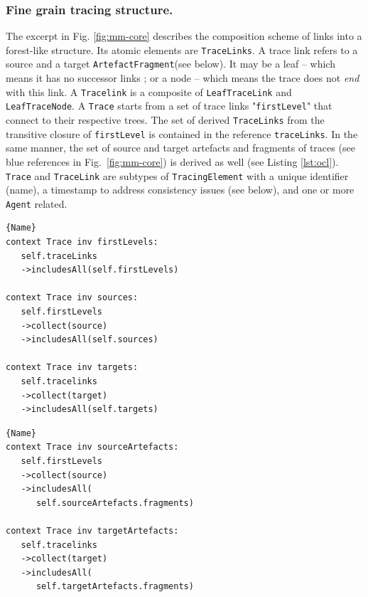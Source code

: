 \subsubsection{Fine grain tracing structure.} The excerpt in Fig. \ref{fig:mm-core} describes the composition scheme of links into a forest-like structure. Its atomic elements are \texttt{TraceLinks}. A trace link refers to a source and a target \texttt{ArtefactFragment}(see below). It may be a leaf -- which means it has no successor links ; or a node -- which means the trace does not \textit{end} with this link. A \texttt{Tracelink} is a composite of \texttt{LeafTraceLink} and \texttt{LeafTraceNode}. A \texttt{Trace} starts from a set of trace links "\texttt{firstLevel}" that connect to their respective trees. The set of derived \texttt{TraceLinks} from the transitive closure of \texttt{firstLevel} is contained in the reference \texttt{traceLinks}. In the same manner, the set of source and target artefacts and fragments of traces (see blue references in Fig.~\ref{fig:mm-core}) is derived as well (see Listing \ref{lst:ocl}).  \texttt{Trace} and \texttt{TraceLink} are subtypes of \texttt{TracingElement} with a unique identifier (name), a timestamp to address consistency issues (see below), and one or more \texttt{Agent} related. 


\lstset{style=mystyleocl}
\noindent\begin{minipage}[t]{.45\textwidth}
\begin{lstlisting}[frame=tlrb]{Name}
context Trace inv firstLevels:
   self.traceLinks
   ->includesAll(self.firstLevels)
   
context Trace inv sources:
   self.firstLevels
   ->collect(source)
   ->includesAll(self.sources)
   
context Trace inv targets:
   self.tracelinks
   ->collect(target)
   ->includesAll(self.targets)
\end{lstlisting}
\end{minipage}\hfill
\begin{minipage}[t]{.45\textwidth}
\begin{lstlisting}[caption={OCL expressions},frame=tlrb,label=lst:ocl]{Name}
context Trace inv sourceArtefacts:
   self.firstLevels
   ->collect(source)
   ->includesAll(
      self.sourceArtefacts.fragments)
   
context Trace inv targetArtefacts:
   self.tracelinks
   ->collect(target)
   ->includesAll(
      self.targetArtefacts.fragments)
\end{lstlisting}

\end{minipage}

